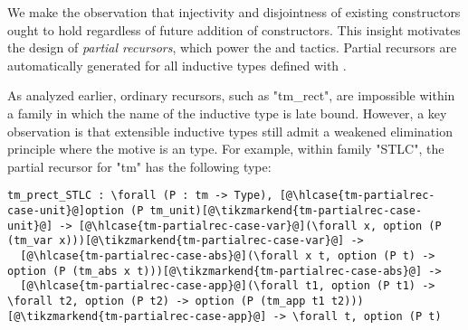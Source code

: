 
We make the observation
that injectivity and disjointness of existing constructors ought to hold
regardless of future addition of constructors.
%
This insight motivates the design of \emph{partial recursors}, which
power the  and  tactics.
Partial recursors are automatically generated for all inductive types
defined with .

As analyzed earlier, ordinary recursors, such as "tm_rect", are impossible
within a family in which the name of the inductive type is late bound.
However,
a key observation is that extensible inductive types still admit a
weakened elimination principle where the motive is an  type.
For example, within family "STLC", the partial recursor for
"tm" has the following type:

\begin{centered}
\begin{minipage}{\textwidth}
\newcommand\hlcase[1]{\tikzmarkin[disable rounded corners=true,set fill color=yellow!18,set border color=yellow!18]{#1}(0.00,-0.05)(-0.00,0.20)}
\begin{lstlisting}[basicstyle=\fontsize{8.25}{9.9}\ttfamily]
tm_prect_STLC : \forall (P : tm -> Type), [@\hlcase{tm-partialrec-case-unit}@]option (P tm_unit)[@\tikzmarkend{tm-partialrec-case-unit}@] -> [@\hlcase{tm-partialrec-case-var}@](\forall x, option (P (tm_var x)))[@\tikzmarkend{tm-partialrec-case-var}@] ->
  [@\hlcase{tm-partialrec-case-abs}@](\forall x t, option (P t) -> option (P (tm_abs x t)))[@\tikzmarkend{tm-partialrec-case-abs}@] ->
  [@\hlcase{tm-partialrec-case-app}@](\forall t1, option (P t1) -> \forall t2, option (P t2) -> option (P (tm_app t1 t2)))[@\tikzmarkend{tm-partialrec-case-app}@] -> \forall t, option (P t)
\end{lstlisting}
\end{minipage}
\end{centered}



